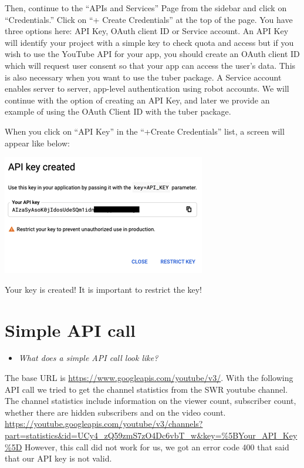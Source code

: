 \documentclass[
]{book}
\providecommand{\tightlist}{%
  \setlength{\itemsep}{0pt}\setlength{\parskip}{0pt}}
\begin{document}
Then, continue to the ``APIs and Services'' Page from the sidebar and click on ``Credentials.'' Click on ``+ Create Credentials'' at the top of the page. You have three options here: API Key, OAuth client ID or Service account. An API Key will identify your project with a simple key to check quota and access but if you wish to use the YouTube API for your app, you should create an OAuth client ID which will request user consent so that your app can access the user's data. This is also necessary when you want to use the tuber package. A Service account enables server to server, app-level authentication using robot accounts. We will continue with the option of creating an API Key, and later we provide an example of using the OAuth Client ID with the tuber package.

When you click on ``API Key'' in the ``+Create Credentials'' list, a screen will appear like below:

\includegraphics{figures/Image_Youtube_API.png}

Your key is created! It is important to restrict the key!

\hypertarget{simple-api-call-8}{%
\section{Simple API call}\label{simple-api-call-8}}

\begin{itemize}
\tightlist
\item
  \emph{What does a simple API call look like?}
\end{itemize}

The base URL is \url{https://www.googleapis.com/youtube/v3/}.
With the following API call we tried to get the channel statistics from the SWR youtube channel. The channel statistics include information on the viewer count, subscriber count, whether there are hidden subscribers and on the video count.
\url{https://youtube.googleapis.com/youtube/v3/channels?part=statistics\&id=UCy4_zQ59zmS7zO4Dc6vbT_w\&key=\%5BYour_API_Key\%5D}
However, this call did not work for us, we got an error code 400 that said that our API key is not valid.
\end{document}
